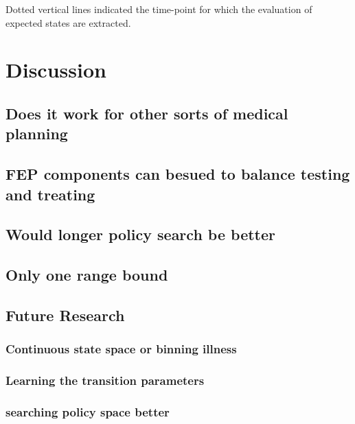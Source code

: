 \documentclass[notspecified,article,submit,moreauthors,pdftex]{Definitions/mdpi}
\begin{document}
Dotted vertical lines indicated the time-point for which the evaluation
of expected states are extracted.

\section{Discussion}\label{discussion}

\subsection{Does it work for other sorts of medical
planning}\label{does-it-work-for-other-sorts-of-medical-planning}

\subsection{FEP components can besued to balance testing and
treating}\label{fep-components-can-besued-to-balance-testing-and-treating}

\subsection{Would longer policy search be
better}\label{would-longer-policy-search-be-better}

\subsection{Only one range bound}\label{only-one-range-bound}

\subsection{Future Research}\label{future-research}

\subsubsection{Continuous state space or binning
illness}\label{continuous-state-space-or-binning-illness}

\subsubsection{Learning the transition
parameters}\label{learning-the-transition-parameters}

\subsubsection{searching policy space
better}\label{searching-policy-space-better}
\end{document}
